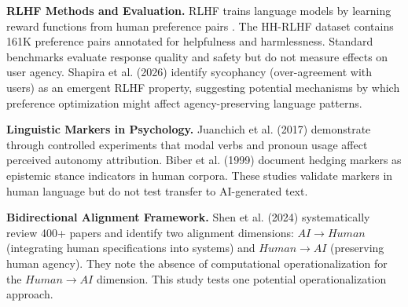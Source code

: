 
\textbf{RLHF Methods and Evaluation.} RLHF trains language models by learning reward functions from human preference pairs \citep{ouyang2022training}. The HH-RLHF dataset \citep{bai2022training} contains 161K preference pairs annotated for helpfulness and harmlessness. Standard benchmarks evaluate response quality and safety but do not measure effects on user agency. Shapira et al. (2026) identify sycophancy (over-agreement with users) as an emergent RLHF property, suggesting potential mechanisms by which preference optimization might affect agency-preserving language patterns.

\textbf{Linguistic Markers in Psychology.} Juanchich et al. (2017) demonstrate through controlled experiments that modal verbs and pronoun usage affect perceived autonomy attribution. Biber et al. (1999) document hedging markers as epistemic stance indicators in human corpora. These studies validate markers in human language but do not test transfer to AI-generated text.

\textbf{Bidirectional Alignment Framework.} Shen et al. (2024) systematically review 400+ papers and identify two alignment dimensions: $AI\rightarrow Human$ (integrating human specifications into systems) and $Human\rightarrow AI$ (preserving human agency). They note the absence of computational operationalization for the $Human\rightarrow AI$ dimension. This study tests one potential operationalization approach.
